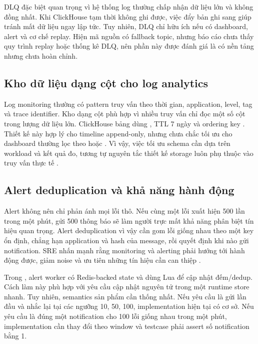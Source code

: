 DLQ đặc biệt quan trọng vì hệ thống log thường chấp nhận dữ liệu lớn và không đồng nhất. Khi ClickHouse tạm thời không ghi được, việc đẩy bản ghi sang  giúp tránh mất dữ liệu ngay lập tức. Tuy nhiên, DLQ chỉ hữu ích nếu có dashboard, alert và cơ chế replay. Hiện mã nguồn có fallback topic, nhưng báo cáo chưa thấy quy trình replay hoặc thống kê DLQ, nên phần này được đánh giá là có nền tảng nhưng chưa hoàn chỉnh.

\subsection{Kho dữ liệu dạng cột cho log analytics}

Log monitoring thường có pattern truy vấn theo thời gian, application, level, tag và trace identifier. Kho dạng cột phù hợp vì nhiều truy vấn chỉ đọc một số cột trong lượng dữ liệu lớn. ClickHouse bảng  dùng , TTL 7 ngày và ordering key . Thiết kế này hợp lý cho timeline append-only, nhưng chưa chắc tối ưu cho dashboard thường lọc theo  hoặc . Vì vậy, việc tối ưu schema cần dựa trên workload và kết quả đo, tương tự nguyên tắc thiết kế storage luôn phụ thuộc vào truy vấn thực tế \cite{petrov2019,greggUSE}.

\subsection{Alert deduplication và khả năng hành động}

Alert không nên chỉ phản ánh mọi lỗi thô. Nếu cùng một lỗi xuất hiện 500 lần trong một phút, gửi 500 thông báo sẽ làm người trực mất khả năng phân biệt tín hiệu quan trọng. Alert deduplication vì vậy cần gom lỗi giống nhau theo một key ổn định, chẳng hạn application và hash của message, rồi quyết định khi nào gửi notification. SRE nhấn mạnh rằng monitoring và alerting phải hướng tới hành động được, giảm noise và ưu tiên những tín hiệu cần can thiệp \cite{sreBook,turnbull2014}.

Trong \LogRider{}, alert worker có Redis-backed state và dùng Lua để cập nhật đếm/dedup. Cách làm này phù hợp với yêu cầu cập nhật nguyên tử trong một runtime store nhanh. Tuy nhiên, semantics sản phẩm cần thống nhất. Nếu yêu cầu là gửi lần đầu và nhắc lại tại các ngưỡng 10, 50, 100, implementation hiện tại có cơ sở. Nếu yêu cầu là đúng một notification cho 100 lỗi giống nhau trong một phút, implementation cần thay đổi theo window và testcase phải assert số notification bằng 1.

